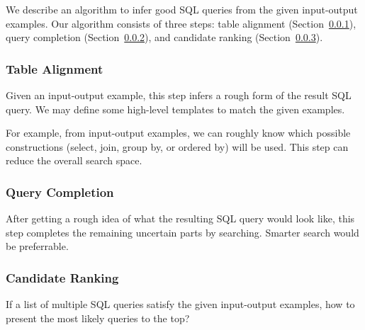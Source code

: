 We describe an algorithm to infer good SQL queries from the given
input-output examples. Our algorithm consists of three steps:
table alignment (Section~\ref{sec:alignment}),
query completion (Section~\ref{sec:completion}), and
candidate ranking (Section~\ref{sec:ranking}).


\subsubsection{Table Alignment}
\label{sec:alignment}

Given an input-output example, this step infers a rough form of the
result SQL query. We may define some high-level templates to match
the given examples.

For example, from input-output examples, we can roughly know which
possible constructions (select, join, group by, or ordered by) will
be used. This step can reduce the overall search space.

\subsubsection{Query Completion}
\label{sec:completion}

After getting a rough idea of what the resulting SQL query would
look like, this step completes the remaining uncertain parts by
searching. Smarter search would be preferrable.

\subsubsection{Candidate Ranking}
\label{sec:ranking}

If a list of multiple SQL queries satisfy the given input-output examples, how
to present the most likely queries to the top?

